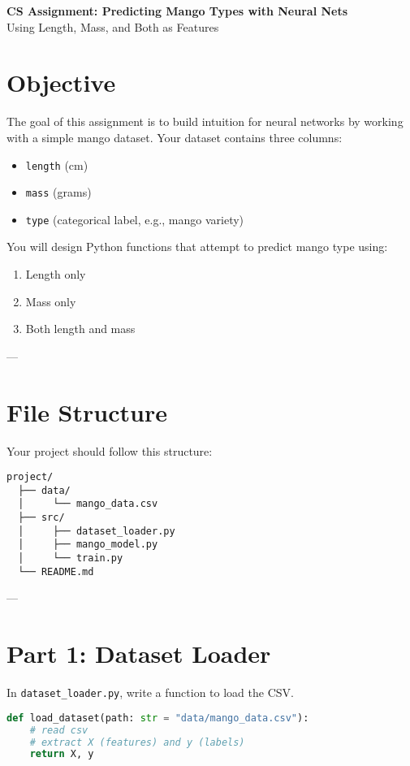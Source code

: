 \documentclass[12pt]{article}
\begin{document}
\begin{center}
    \LARGE \textbf{CS Assignment: Predicting Mango Types with Neural Nets} \\
    \vspace{0.5cm}
    \large Using Length, Mass, and Both as Features
\end{center}

\section*{Objective}
The goal of this assignment is to build intuition for neural networks by working with a simple mango dataset.  
Your dataset contains three columns:

\begin{itemize}
    \item \texttt{length} (cm)
    \item \texttt{mass} (grams)
    \item \texttt{type} (categorical label, e.g., mango variety)
\end{itemize}

You will design Python functions that attempt to predict mango type using:
\begin{enumerate}
    \item Length only
    \item Mass only
    \item Both length and mass
\end{enumerate}

---

\section*{File Structure}
Your project should follow this structure:
\begin{verbatim}
project/
  ├── data/
  │     └── mango_data.csv
  ├── src/
  │     ├── dataset_loader.py
  │     ├── mango_model.py
  │     └── train.py
  └── README.md
\end{verbatim}

---

\section*{Part 1: Dataset Loader}
In \texttt{dataset\_loader.py}, write a function to load the CSV.

\begin{lstlisting}[language=Python]
def load_dataset(path: str = "data/mango_data.csv"):
    # read csv
    # extract X (features) and y (labels)
    return X, y
\end{lstlisting}
\end{document}
